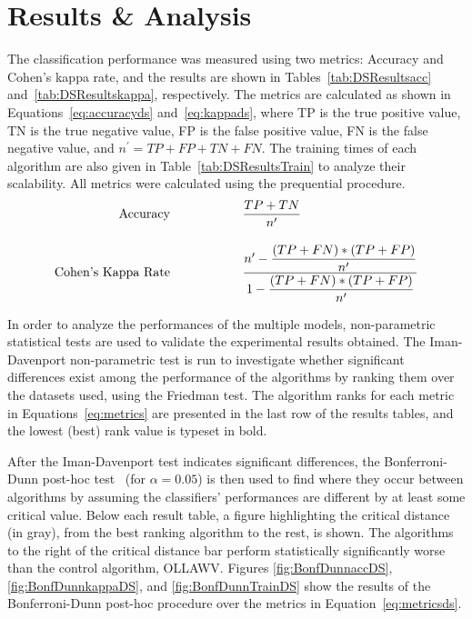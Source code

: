 \documentclass[reqno]{vcuthesis}
\newcommand\tab[1][1cm]{\hspace*{#1}}
\numberwithin{equation}{chapter}
\begin{document}
\section{Results \& Analysis}
The classification performance was measured using two metrics: Accuracy and Cohen's kappa rate, and the results are shown in Tables~\ref{tab:DSResultsacc} and~\ref{tab:DSResultskappa}, respectively. The metrics are calculated as shown in Equations~\ref{eq:accuracyds} and~\ref{eq:kappads}, where TP is the true positive value, TN is the true negative value, FP is the false positive value, FN is the false negative value, and $n^\prime = TP + FP + TN + FN$. The training times of each algorithm are also given in Table~\ref{tab:DSResultsTrain} to analyze their scalability. All metrics were calculated using the prequential procedure. 
\begin{subequations}\vspace{-1.8em}
\label{eq:metricsds}
\begin{align}
\text{Accuracy} \tab \tab &\dfrac{TP+TN}{n^\prime} \label{eq:accuracyds}\\[10pt]
\text{Cohen's Kappa Rate} \tab \tab &\dfrac{n^\prime - \dfrac{(TP+FN)*(TP+FP)}{n^\prime}}{1 - \dfrac{(TP+FN)*(TP+FP)}{n^\prime}} \label{eq:kappads}
\end{align}
\end{subequations}

In order to analyze the performances of the multiple models, non-parametric statistical tests are used to validate the experimental results obtained. The Iman-Davenport non-parametric test is run to investigate whether significant differences exist among the performance of the algorithms by ranking them over the datasets used, using the Friedman test. The algorithm ranks for each metric in Equations~\eqref{eq:metrics} are presented in the last row of the results tables, and the lowest (best) rank value is typeset in bold. 

After the Iman-Davenport test indicates significant differences, the Bonferroni-Dunn post-hoc test~\cite{Dunn1961} (for $\alpha = 0.05$) is then used to find where they occur between algorithms by assuming the classifiers' performances are different by at least some critical value. Below each result table, a figure highlighting the critical distance (in gray), from the best ranking algorithm to the rest, is shown. The algorithms to the right of the critical distance bar perform statistically significantly worse than the control algorithm, OLLAWV. Figures \ref{fig:BonfDunnaccDS}, \ref{fig:BonfDunnkappaDS}, and \ref{fig:BonfDunnTrainDS} show the results of the Bonferroni-Dunn post-hoc procedure over the metrics in Equation~\eqref{eq:metricsds}.
\end{document}
